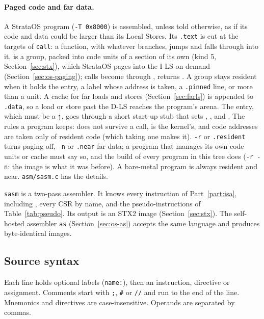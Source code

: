 \paragraph{Paged code and far data.}\label{sec:sasm-paged} A StrataOS program (\texttt{-T 0x8000}) is assembled, unless told
otherwise, as if its code and data could be larger than its Local Stores. Its \texttt{.text} is cut at
the targets of \texttt{call}: a function, with whatever branches, jumps and falls through into it, is a
group, packed into code units of a section of its own (kind 5, Section~\ref{sec:stx}), which StrataOS
pages into the I-LS on demand (Section~\ref{sec:os-paging}); calls become  through
, returns . A group stays resident when it holds the entry, a label whose address
is taken, a \texttt{.pinned} line, or more than a unit. A cache for far loads and stores
(Section~\ref{sec:farls}) is appended to \texttt{.data}, so a load or store past the D-LS reaches the
program's arena. The entry, which must be a \texttt{j}, goes through a short start-up stub that sets
, ,  and . The rules a program keeps:  does not
survive a call,  is the kernel's, and code addresses are taken only of resident code (which
taking one makes it). \texttt{-r} or \texttt{.resident} turns paging off, \texttt{-n} or \texttt{.near}
far data; a program that manages its own code units or cache must say so, and the build of every
program in this tree does (\texttt{-r -n}: the image is what it was before). A bare-metal program is
always resident and near. \texttt{asm/sasm.c} has the details.

\texttt{sasm} is a two-pass assembler. It knows every instruction of Part~\ref{part:isa}, including
, every CSR by name, and the pseudo-instructions of Table~\ref{tab:pseudo}. Its output is an
STX2 image (Section~\ref{sec:stx}). The self-hosted assembler \texttt{as} (Section~\ref{sec:os-as})
accepts the same language and produces byte-identical images.

\subsection{Source syntax}
Each line holds optional labels (\texttt{name:}), then an instruction, directive or assignment.
Comments start with \texttt{;}, \texttt{\#} or \texttt{//} and run to the end of the line. Mnemonics and
directives are case-insensitive. Operands are separated by commas.

